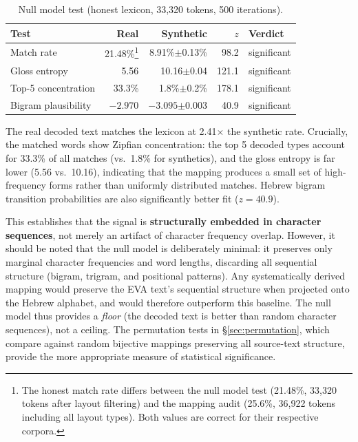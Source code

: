 \documentclass[11pt,a4paper]{article}
\begin{document}
\begin{table}[htbp]
\centering
\caption{Null model test (honest lexicon, 33,320 tokens, 500 iterations).}
\label{tab:nullmodel}
\small
\begin{tabular}{@{}lrrrl@{}}
\toprule
Test & Real & Synthetic & $z$ & Verdict \\
\midrule
Match rate & 21.48\%\footnote{The honest match rate differs between the null model test (21.48\%, 33,320 tokens after layout filtering) and the mapping audit (25.6\%, 36,922 tokens including all layout types). Both values are correct for their respective corpora.} & 8.91\%$\pm$0.13\% & 98.2 & significant \\
Gloss entropy & 5.56 & 10.16$\pm$0.04 & 121.1 & significant \\
Top-5 concentration & 33.3\% & 1.8\%$\pm$0.2\% & 178.1 & significant \\
Bigram plausibility & $-2.970$ & $-3.095$$\pm$0.003 & 40.9 & significant \\
\bottomrule
\end{tabular}
\end{table}

The real decoded text matches the lexicon at 2.41$\times$ the synthetic rate.
Crucially, the matched words show Zipfian concentration: the top 5 decoded
types account for 33.3\% of all matches (vs.\ 1.8\% for synthetics), and
the gloss entropy is far lower (5.56 vs.\ 10.16), indicating that the
mapping produces a small set of high-frequency forms rather than uniformly
distributed matches. Hebrew bigram transition probabilities are also
significantly better fit ($z=40.9$).

This establishes that the signal is \textbf{structurally embedded in
character sequences}, not merely an artifact of character frequency overlap.
However, it should be noted that the null model is deliberately minimal:
it preserves only marginal character frequencies and word lengths, discarding
all sequential structure (bigram, trigram, and positional patterns). Any
systematically derived mapping would preserve the EVA text's sequential
structure when projected onto the Hebrew alphabet, and would therefore
outperform this baseline. The null model thus provides a \emph{floor}
(the decoded text is better than random character sequences), not a
ceiling. The permutation tests in \S\ref{sec:permutation}, which compare
against random bijective mappings preserving all source-text structure,
provide the more appropriate measure of statistical significance.
\end{document}
